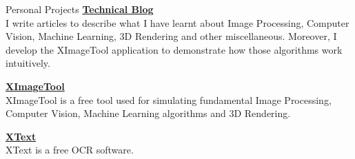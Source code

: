 \documentclass{resume}
\begin{document}
	\begin{rSection}{Personal Projects}
		{\bf \href{https://noidh.github.io/blog.html}{Technical Blog}}
		\\ I write articles to describe what I have learnt about Image Processing, Computer Vision, Machine Learning, 3D Rendering and other miscellaneous.  Moreover,  I develop the XImageTool application to demonstrate how those algorithms work intuitively.

		{\bf  \href{https://noidh.github.io/pages/sw/ximagetool/ximagetool.html}{XImageTool}}
		\\ XImageTool is a free tool used for simulating fundamental Image Processing, Computer Vision, Machine Learning algorithms and 3D Rendering.

		{\bf \href{https://noidh.github.io/pages/sw/ximage2text/ximagetotext.html}{XText}}
		\\ XText is a free OCR software.
	\end{rSection}
\end{document}
